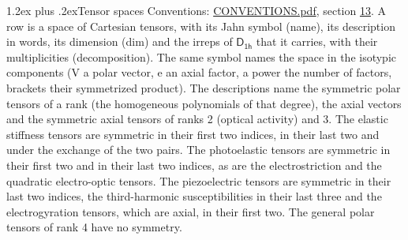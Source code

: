 \documentclass[10pt,a4paper]{article}
\makeatletter
\renewcommand\section{\@startsection{section}{1}{\z@}{-3ex plus -1ex minus -.2ex}%
  {1.2ex plus .2ex}{\normalfont\large\sffamily\bfseries\color{parttitle}}}
\numberwithin{equation}{section}
\newcommand{\grp}[1]{\mathsf{#1}}
\makeatother
\begin{document}
\section{Tensor spaces}\label{s:tensor_spaces}
Conventions: \href{../../CONVENTIONS.pdf}{CONVENTIONS.pdf}, section \href{../../CONVENTIONS.pdf\#conv.13}{13}.
\leavevmode\label{n:head.name}\label{n:head.description}\label{n:head.dim}\label{n:head.decomposition}A row is a space of Cartesian tensors, with its Jahn symbol (name), its description in words, its dimension (dim) and the irreps of $\grp{D_{1h}}$ that it carries, with their multiplicities (decomposition). \label{n:label.jahn}The same symbol names the space in the isotypic components (V a polar vector, e an axial factor, a power the number of factors, brackets their symmetrized product). The descriptions name the symmetric polar tensors of a rank (the homogeneous polynomials of that degree), the axial vectors and the symmetric axial tensors of ranks 2 (optical activity) and 3. The elastic stiffness tensors are symmetric in their first two indices, in their last two and under the exchange of the two pairs. The photoelastic tensors are symmetric in their first two and in their last two indices, as are the electrostriction and the quadratic electro-optic tensors. The piezoelectric tensors are symmetric in their last two indices, the third-harmonic susceptibilities in their last three and the electrogyration tensors, which are axial, in their first two. The general polar tensors of rank 4 have no symmetry.
\end{document}
